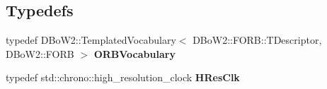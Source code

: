 \subsection*{Typedefs}
\begin{DoxyCompactItemize}
\item 
typedef D\+Bo\+W2\+::\+Templated\+Vocabulary$<$ D\+Bo\+W2\+::\+F\+O\+R\+B\+::\+T\+Descriptor, D\+Bo\+W2\+::\+F\+O\+RB $>$ {\bfseries O\+R\+B\+Vocabulary}\hypertarget{namespaceMultiColSLAM_a894f61cf7db6c87ca56c02c3166c84ef}{}\label{namespaceMultiColSLAM_a894f61cf7db6c87ca56c02c3166c84ef}

\item 
typedef std\+::chrono\+::high\+\_\+resolution\+\_\+clock {\bfseries H\+Res\+Clk}\hypertarget{namespaceMultiColSLAM_a8b11e8e6be42faf8c1fdf420d856066f}{}\label{namespaceMultiColSLAM_a8b11e8e6be42faf8c1fdf420d856066f}

\end{DoxyCompactItemize}
